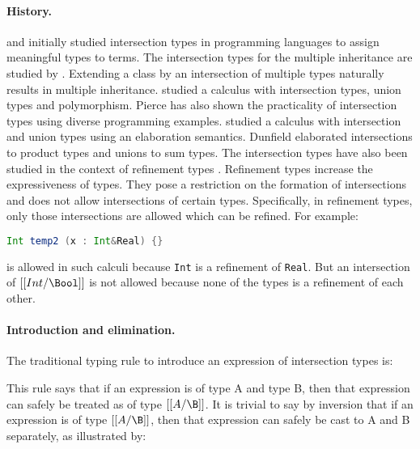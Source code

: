 \paragraph{History.}
\cite{coppo1981functional} and \cite{pottinger1980type}
initially studied intersection types in 
programming languages to assign meaningful types to terms.
The intersection types for the multiple inheritance are 
studied by \cite{compagnoni1996higher}.
Extending a class by an intersection of multiple 
types naturally results in multiple inheritance.
\cite{pierce1991programming} studied a 
calculus with intersection types, union types 
and polymorphism. Pierce has also shown the practicality 
of intersection types using diverse programming examples.
\cite{dunfield2014elaborating} studied a calculus with 
intersection and union types using an elaboration semantics.
Dunfield elaborated intersections to product types and unions to sum types.
The intersection types have also been studied in the context of refinement types
\citep{freeman1991refinement}. Refinement types increase the expressiveness of
types. They pose a restriction on the 
formation of intersections and does not
allow intersections of certain types.
Specifically, in refinement types, only those intersections
are allowed which can be refined.
For example:

\begin{lstlisting}[language=Scala]
Int temp2 (x : Int&Real) {}
\end{lstlisting}

\noindent is allowed in such calculi because \lstinline{Int}
is a refinement of \lstinline{Real}. But an 
intersection of $[[Int/\Bool]]$ is not allowed because none
of the types is a refinement of each other.

\paragraph{Introduction and elimination.}
The traditional typing rule to introduce an expression of intersection types is:

\begin{center}
\end{center}

This rule says that if an expression is of type A and type B, then that expression
can safely be treated as of type $[[A/\B]]$. It is trivial
to say by inversion that if an expression is of type $[[A/\B]]$, then that
expression can safely be cast to A and B separately, as illustrated by:

